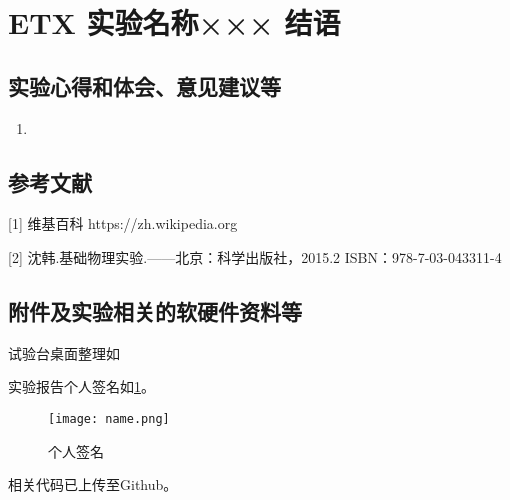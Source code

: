 \documentclass[dvipsnames, svgnames,a4paper,11pt]{article}
\begin{document}
	\begin{question}
		
	\end{question}
	
	\begin{question}
		
	\end{question}
	
	
	
	\clearpage
	
	\section{ETX 实验名称××× \quad\heiti 结语}
	
	\subsection{实验心得和体会、意见建议等}
	\begin{enumerate}
		\item 
	\end{enumerate}
	
	\subsection{参考文献}
	[1] 维基百科 https://zh.wikipedia.org
	
	[2] 沈韩.基础物理实验.——北京：科学出版社，2015.2 ISBN：978-7-03-043311-4
	
	
	\subsection{附件及实验相关的软硬件资料等}
	试验台桌面整理如%
	
	实验报告个人签名如\cref{fig:name}。
	
	\begin{figure}[htbp]
		\centering
		\texttt{[image: name.png]}
		\caption{个人签名}
		\label{fig:name}
	\end{figure}
	
	
	相关代码已上传至Github。
	
	
	
\end{document}
